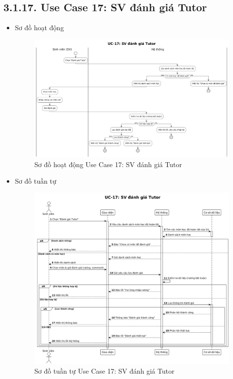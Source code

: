\subsection*{3.1.17. Use Case 17: SV đánh giá Tutor}
\begin{itemize}
    \item Sơ đồ hoạt động
    \begin{figure}[H]
    \centering
    \includegraphics[scale=0.35 ]{Picture/ACUC17.png}
    \caption{Sơ đồ hoạt động Use Case 17: SV đánh giá Tutor}
    \end{figure}
    \item Sơ đồ tuần tự
    \begin{figure}[H]
    \centering
    \includegraphics[scale=0.35 ]{Picture/SEUC17.png}
    \caption{Sơ đồ tuần tự Use Case 17: SV đánh giá Tutor}
    \end{figure}
\end{itemize}
